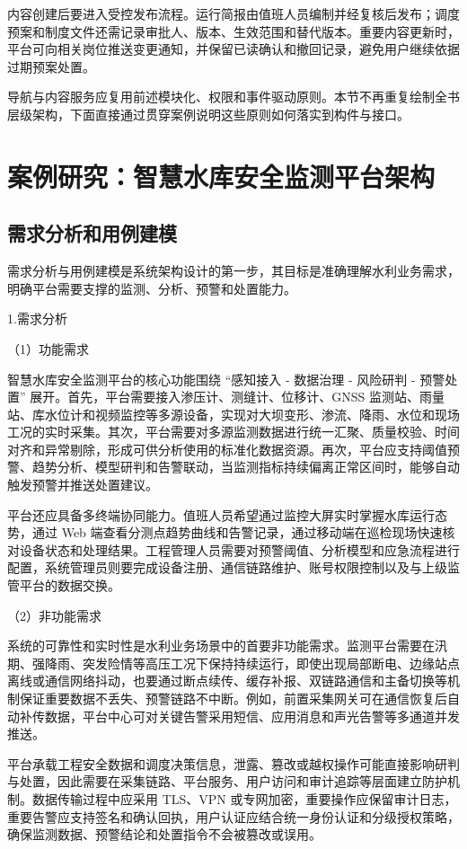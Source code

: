 内容创建后要进入受控发布流程。运行简报由值班人员编制并经复核后发布；调度预案和制度文件还需记录审批人、版本、生效范围和替代版本。重要内容更新时，平台可向相关岗位推送变更通知，并保留已读确认和撤回记录，避免用户继续依据过期预案处置。

导航与内容服务应复用前述模块化、权限和事件驱动原则。本节不再重复绘制全书层级架构，下面直接通过贯穿案例说明这些原则如何落实到构件与接口。

\section{案例研究：智慧水库安全监测平台架构}

\subsection{需求分析和用例建模}

需求分析与用例建模是系统架构设计的第一步，其目标是准确理解水利业务需求，明确平台需要支撑的监测、分析、预警和处置能力。

1.需求分析

（1）功能需求

智慧水库安全监测平台的核心功能围绕 “感知接入 - 数据治理 - 风险研判 - 预警处置” 展开。首先，平台需要接入渗压计、测缝计、位移计、GNSS 监测站、雨量站、库水位计和视频监控等多源设备，实现对大坝变形、渗流、降雨、水位和现场工况的实时采集。其次，平台需要对多源监测数据进行统一汇聚、质量校验、时间对齐和异常剔除，形成可供分析使用的标准化数据资源。再次，平台应支持阈值预警、趋势分析、模型研判和告警联动，当监测指标持续偏离正常区间时，能够自动触发预警并推送处置建议。

平台还应具备多终端协同能力。值班人员希望通过监控大屏实时掌握水库运行态势，通过 Web 端查看分测点趋势曲线和告警记录，通过移动端在巡检现场快速核对设备状态和处理结果。工程管理人员需要对预警阈值、分析模型和应急流程进行配置，系统管理员则要完成设备注册、通信链路维护、账号权限控制以及与上级监管平台的数据交换。

（2）非功能需求

系统的可靠性和实时性是水利业务场景中的首要非功能需求。监测平台需要在汛期、强降雨、突发险情等高压工况下保持持续运行，即使出现局部断电、边缘站点离线或通信网络抖动，也要通过断点续传、缓存补报、双链路通信和主备切换等机制保证重要数据不丢失、预警链路不中断。例如，前置采集网关可在通信恢复后自动补传数据，平台中心可对关键告警采用短信、应用消息和声光告警等多通道并发推送。

平台承载工程安全数据和调度决策信息，泄露、篡改或越权操作可能直接影响研判与处置，因此需要在采集链路、平台服务、用户访问和审计追踪等层面建立防护机制。数据传输过程中应采用 TLS、VPN 或专网加密，重要操作应保留审计日志，重要告警应支持签名和确认回执，用户认证应结合统一身份认证和分级授权策略，确保监测数据、预警结论和处置指令不会被篡改或误用。


